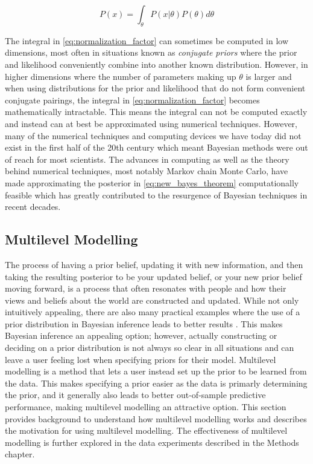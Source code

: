\begin{equation} \label{eq:normalization_factor}
P(x) = \int_{\theta} P(x|\theta)P(\theta) d\theta
\end{equation}

The integral in \ref{eq:normalization_factor} can sometimes be computed in low dimensions, most often in situations known as \textit{conjugate priors} where the prior and likelihood conveniently combine into another known distribution. However, in higher dimensions where the number of parameters making up $\theta$ is larger and when using distributions for the prior and likelihood that do not form convenient conjugate pairings, the integral in \ref{eq:normalization_factor} becomes mathematically intractable. This means the integral can not be computed exactly and instead can at best be approximated using numerical techniques. However, many of the numerical techniques and computing devices we have today did not exist in the first half of the 20th century which meant Bayesian methods were out of reach for most scientists. The advances in computing as well as the theory behind numerical techniques, most notably Markov chain Monte Carlo, have made approximating the posterior in \ref{eq:new_bayes_theorem} computationally feasible which has greatly contributed to the resurgence of Bayesian techniques in recent decades.

\subsection{Multilevel Modelling} \label{Multilevel_Modelling}

The process of having a prior belief, updating it with new information, and then taking the resulting posterior to be your updated belief, or your new prior belief moving forward, is a process that often resonates with people and how their views and beliefs about the world are constructed and updated. While not only intuitively appealing, there are also many practical examples where the use of a prior distribution in Bayesian inference leads to better results \cite{Schoot2021}. This makes Bayesian inference an appealing option; however, actually constructing or deciding on a prior distribution is not always so clear in all situations and can leave a user feeling lost when specifying priors for their model. Multilevel modelling is a method that lets a user instead set up the prior to be learned from the data. This makes specifying a prior easier as the data is primarly determining the prior, and it generally also leads to better out-of-sample predictive performance, making multilevel modelling an attractive option. This section provides background to understand how multilevel modelling works and describes the motivation for using multilevel modelling. The effectiveness of multilevel modelling is further explored in the data experiments described in the Methods chapter.

